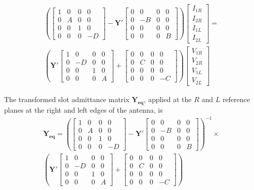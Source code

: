 \documentclass{article}
\begin{document}
\begin{multline}
	\left(\begin{bmatrix}1 & 0&0&0\\0&A&0&0\\0&0&1&0\\0&0&0&-D\end{bmatrix} -\mathbf{Y'}\begin{bmatrix}0 & 0&0&0\\0&-B&0&0\\0&0&0&0\\0&0&0&B\end{bmatrix}\right)\begin{bmatrix}I_{1R}\\ I_{2R}\\I_{1L}\\I_{2L}\end{bmatrix} =\\
	\left(\mathbf{Y'}\begin{bmatrix}1 & 0&0&0\\0&-D&0&0\\0&0&1&0\\0&0&0&A\end{bmatrix} +\begin{bmatrix}0 & 0&0&0\\0&C&0&0\\0&0&0&0\\0&0&0&-C\end{bmatrix}\right)\begin{bmatrix}V_{1R}\\ V_{2R}\\V_{1L}\\V_{2L}\end{bmatrix}
\end{multline}

The transformed slot admittance matrix $\mathbf{Y_{eq}}$, applied at the $R$ and $L$ reference planes at the right and left edges of the antenna, is
\begin{multline}
	\mathbf{Y_{eq}}=\left(\begin{bmatrix}1 & 0&0&0\\0&A&0&0\\0&0&1&0\\0&0&0&-D\end{bmatrix} -\mathbf{Y'}\begin{bmatrix}0 & 0&0&0\\0&-B&0&0\\0&0&0&0\\0&0&0&B\end{bmatrix}\right)^{-1}\times\\ \left(\mathbf{Y'}\begin{bmatrix}1 & 0&0&0\\0&-D&0&0\\0&0&1&0\\0&0&0&A\end{bmatrix} +\begin{bmatrix}0 & 0&0&0\\0&C&0&0\\0&0&0&0\\0&0&0&-C\end{bmatrix}\right)
\end{multline}
\end{document}
